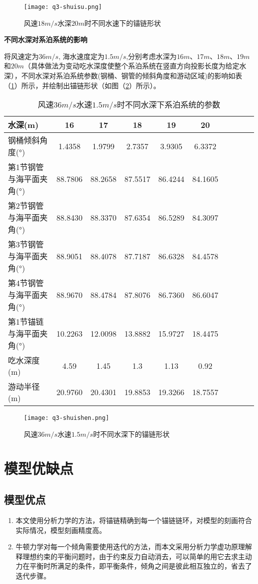 \documentclass[withoutpreface,bwprint]{cumcmthesis} %
\begin{document}
\begin{figure}[h]
\small
\centering
\texttt{[image: q3-shuisu.png]}
\caption{风速$18m/s$水深$20m$时不同水速下的锚链形状} \label{fig:q3-shuisu}
\end{figure}

\textbf{不同水深对系泊系统的影响}
\par 将风速定为$36m/s$, 海水速度定为$1.5m/s$,分别考虑水深为$16m$、$17m$、$18m$、$19m$和$20m$（具体做法为变动吃水深度使整个系泊系统在竖直方向投影长度为给定水深），不同水深对系泊系统参数(钢桶、钢管的倾斜角度和游动区域)的影响如表（\ref{q3-ans-table4}）所示，并绘制出锚链形状（如图（\ref{fig:q3-shuishen}）所示）。


\begin{table}[!htbp]
\centering
\caption{风速$36m/s$水速$1.5m/s$时不同水深下系泊系统的参数}
\label{q3-ans-table4}
\begin{tabular}{lccccccccc}
\toprule
水深(m)&16&17&18&19&20 \\
\midrule
钢桶倾斜角度(°)&1.4358&1.9799&2.7357&3.9305&6.3372\\
第1节钢管与海平面夹角(°)&88.7806&88.2658&87.5517&86.4244&84.1605\\
第2节钢管与海平面夹角(°)&88.8430&88.3370&87.6354&86.5289&84.3097\\
第3节钢管与海平面夹角(°)&88.9051&88.4078&87.7187&86.6328&84.4578\\
第4节钢管与海平面夹角(°)&88.9670&88.4784&87.8076&86.7360&86.6047\\
第1节锚链与海平面夹角(°)&10.2263&12.0098&13.8882&15.9727&18.4475\\
吃水深度(m)&4.59&1.45&1.3&1.13&0.92\\
游动半径(m)&20.9760&20.4301&19.8853&19.3266&18.7557\\
\bottomrule 
\end{tabular}
\end{table}


\begin{figure}[h]
\small
\centering
\texttt{[image: q3-shuishen.png]}
\caption{风速$36m/s$水速$1.5m/s$时不同水深下的锚链形状} \label{fig:q3-shuishen}
\end{figure}



\newpage
\newpage

\section{模型优缺点}
\subsection{模型优点}
\begin{enumerate}
	\item 本文使用分析力学的方法，将锚链精确到每一个锚链链环，对模型的刻画符合实际情况，模型刻画精度高。
	\item 牛顿力学对每一个倾角需要使用迭代的方法，而本文采用分析力学虚功原理解释理想约束的平衡问题时，由于约束反力自动消去，可以简单的用它去求主动力在平衡时所满足的条件，即平衡条件，倾角之间是彼此相互独立的，省去了迭代步骤。
\end{enumerate}
\end{document}
